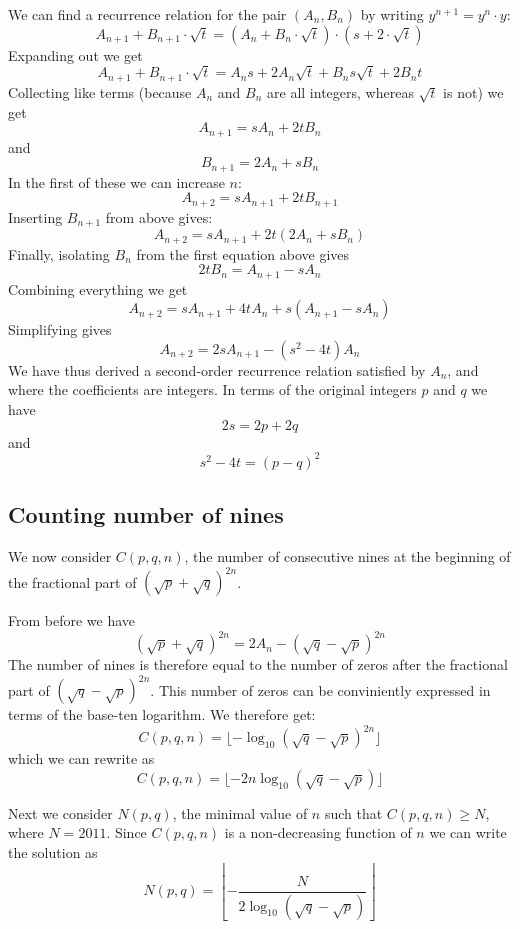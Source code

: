 \documentclass[12pt,oneside,a4paper]{article}
\begin{document}
We can find a recurrence relation for the pair $(A_n, B_n)$ by writing $y^{n+1} = y^n
\cdot y$:
\[
    A_{n+1} + B_{n+1}\cdot\sqrt{t} = \left(A_n + B_n\cdot\sqrt{t}\right) \cdot \left(s +
    2\cdot\sqrt{t}\right)
\]
Expanding out we get
\[
    A_{n+1} + B_{n+1}\cdot\sqrt{t} = A_{n}s + 2A_n\sqrt{t} + B_{n}s\sqrt{t}+2B_{n}t
\]
Collecting like terms (because $A_n$ and $B_n$ are all integers, whereas $\sqrt{t}$ is not) we get
\[
    A_{n+1} = sA_{n} + 2tB_{n}
\]
and
\[
    B_{n+1} = 2A_{n}+sB_{n}
\]
In the first of these we can increase $n$:
\[
    A_{n+2} = sA_{n+1} + 2tB_{n+1}
\]
Inserting $B_{n+1}$ from above gives:
\[
    A_{n+2} = sA_{n+1} + 2t(2A_{n}+sB_{n})
\]
Finally, isolating $B_n$ from the first equation above gives
\[
    2tB_{n} = A_{n+1} - sA_{n}
\]
Combining everything we get
\[
    A_{n+2} = sA_{n+1} + 4tA_{n}+s(A_{n+1} - sA_{n})
\]
Simplifying gives
\[
    A_{n+2} = 2sA_{n+1} - (s^2-4t)A_{n}
\]
We have thus derived a second-order recurrence relation satisfied by $A_n$, and where the
coefficients are integers. In terms of the original integers $p$ and $q$ we have
\[
    2s = 2p + 2q
\]
and
\[
    s^2-4t = {(p-q)}^2
\]

\subsection{Counting number of nines}
We now consider $C(p,q,n)$, the number of consecutive nines at the beginning of the fractional part
of ${\left(\sqrt{p} + \sqrt{q}\right)}^{2n}$.

From before we have
\[
    {\left(\sqrt{p} + \sqrt{q}\right)}^{2n} = 2A_n - {\left(\sqrt{q} - \sqrt{p}\right)}^{2n}
\]
The number of nines is therefore equal to the number of zeros after the fractional part of
${\left(\sqrt{q} - \sqrt{p}\right)}^{2n}$. This number of zeros can be conviniently
expressed in terms of the base-ten logarithm. We therefore get:
\[
    C(p,q,n) = \lfloor-\log_{10}{\left(\sqrt{q} - \sqrt{p}\right)}^{2n}\rfloor
\]
which we can rewrite as
\[
    C(p,q,n) = \lfloor-2n\log_{10}{\left(\sqrt{q} - \sqrt{p}\right)}\rfloor
\]

Next we consider $N(p,q)$, the minimal value of $n$ such that $C(p,q,n) \ge N$, where $N=2011$.
Since $C(p,q,n)$ is a non-decreasing function of $n$ we can write the solution as
\[
    N(p,q) = \left\lfloor-\frac{N}{2\log_{10}{\left(\sqrt{q} - \sqrt{p}\right)}}\right\rfloor
\]
\end{document}
